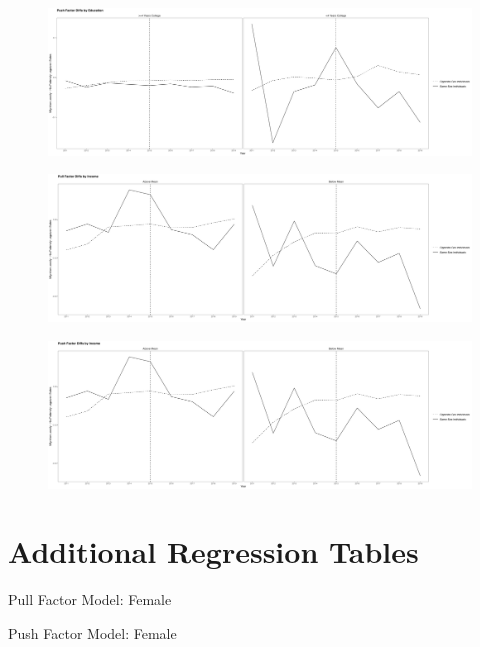 \documentclass[12pt,letterpaper]{article}
\begin{document}
\begin{figure}[htbp]
    \centering
    \includegraphics[width=0.75\linewidth]{outputs/summary_stats/educ_ante_diffs.png}
    \caption{}
    \label{fig: fig:enter-label}
\end{figure}

\begin{figure}[htbp]
    \centering
    \includegraphics[width=0.75\linewidth]{outputs/summary_stats/inc_post_diffs.png}
    \caption{}
    \label{fig: fig:enter-label}
\end{figure}

\begin{figure}[htbp]
    \centering
    \includegraphics[width=0.75\linewidth]{outputs/summary_stats/inc_ante_diffs.png}
    \caption{}
    \label{fig: fig:enter-label}
\end{figure}

\FloatBarrier
\newpage
\section{Additional Regression Tables}
\begin{table}[htbp]
    \centering
    \caption{Pull Factor Model: Female}
    \label{tab: female_expost_model}
    
\end{table}
\begin{table}[htbp] %
    \centering
    \caption{Push Factor Model: Female}
    \label{tab: female_exante_model}
    
\end{table}
\end{document}
